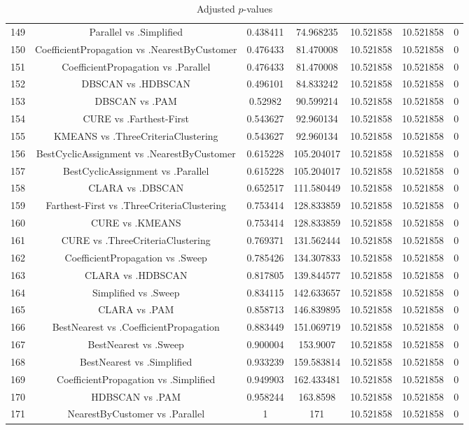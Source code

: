 \documentclass[a4paper,10pt]{article}
\begin{document}
\begin{landscape}
\begin{table}[!htp]
\begin{tabular}{ccccccc}
149&Parallel vs .Simplified&0.438411&74.968235&10.521858&10.521858&0\\
150&CoefficientPropagation vs .NearestByCustomer&0.476433&81.470008&10.521858&10.521858&0\\
151&CoefficientPropagation vs .Parallel&0.476433&81.470008&10.521858&10.521858&0\\
152&DBSCAN vs .HDBSCAN&0.496101&84.833242&10.521858&10.521858&0\\
153&DBSCAN vs .PAM&0.52982&90.599214&10.521858&10.521858&0\\
154&CURE vs .Farthest-First&0.543627&92.960134&10.521858&10.521858&0\\
155&KMEANS vs .ThreeCriteriaClustering&0.543627&92.960134&10.521858&10.521858&0\\
156&BestCyclicAssignment vs .NearestByCustomer&0.615228&105.204017&10.521858&10.521858&0\\
157&BestCyclicAssignment vs .Parallel&0.615228&105.204017&10.521858&10.521858&0\\
158&CLARA vs .DBSCAN&0.652517&111.580449&10.521858&10.521858&0\\
159&Farthest-First vs .ThreeCriteriaClustering&0.753414&128.833859&10.521858&10.521858&0\\
160&CURE vs .KMEANS&0.753414&128.833859&10.521858&10.521858&0\\
161&CURE vs .ThreeCriteriaClustering&0.769371&131.562444&10.521858&10.521858&0\\
162&CoefficientPropagation vs .Sweep&0.785426&134.307833&10.521858&10.521858&0\\
163&CLARA vs .HDBSCAN&0.817805&139.844577&10.521858&10.521858&0\\
164&Simplified vs .Sweep&0.834115&142.633657&10.521858&10.521858&0\\
165&CLARA vs .PAM&0.858713&146.839895&10.521858&10.521858&0\\
166&BestNearest vs .CoefficientPropagation&0.883449&151.069719&10.521858&10.521858&0\\
167&BestNearest vs .Sweep&0.900004&153.9007&10.521858&10.521858&0\\
168&BestNearest vs .Simplified&0.933239&159.583814&10.521858&10.521858&0\\
169&CoefficientPropagation vs .Simplified&0.949903&162.433481&10.521858&10.521858&0\\
170&HDBSCAN vs .PAM&0.958244&163.8598&10.521858&10.521858&0\\
171&NearestByCustomer vs .Parallel&1&171&10.521858&10.521858&0\\
\hline
\end{tabular}
\caption{Adjusted $p$-values}
\end{table}

\end{landscape}
\end{document}
